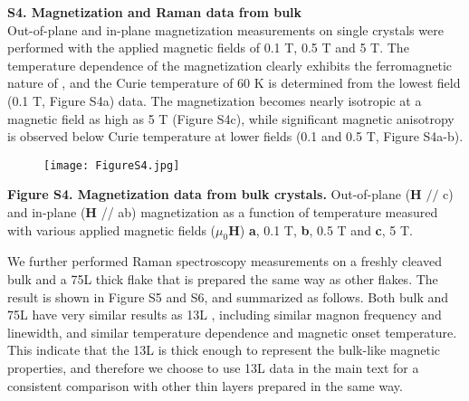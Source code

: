 \documentclass[prl, preprint, superscriptaddress]{revtex4-1}
\begin{document}

\noindent\textbf{S4. Magnetization and Raman data from bulk }\\

\noindent Out-of-plane and in-plane magnetization measurements on  single crystals were performed with the applied magnetic fields of 0.1 T, 0.5 T and 5 T. The temperature dependence of the magnetization clearly exhibits the ferromagnetic nature of , and the Curie temperature of 60 K is determined from the lowest field (0.1 T, Figure S4a) data. The magnetization becomes nearly isotropic at a magnetic field as high as 5 T (Figure S4c), while significant magnetic anisotropy is observed below Curie temperature at lower fields (0.1 and 0.5 T, Figure S4a-b).  

\begin{figure}[!h]
\texttt{[image: FigureS4.jpg]}
\end{figure}
\vspace{-5pt}
\begin{footnotesize}
\noindent\textbf{Figure S4. Magnetization data from bulk  crystals.} Out-of-plane (\textbf{H} $//$ c) and in-plane (\textbf{H} // ab) magnetization as a function of temperature measured with various applied magnetic fields ($\mu_0$\textbf{H}) \textbf{a}, 0.1 T, \textbf{b}, 0.5 T and \textbf{c}, 5 T. \\
\end{footnotesize}

\noindent We further performed Raman spectroscopy measurements on a freshly cleaved  bulk and a 75L thick  flake that is prepared the same way as other flakes. The result is shown in Figure S5 and S6, and summarized as follows. Both bulk and 75L  have very similar results as 13L , including similar magnon frequency and linewidth, and similar temperature dependence and magnetic onset temperature. This indicate that the 13L  is thick enough to represent the bulk-like magnetic properties, and therefore we choose to use 13L  data in the main text for a consistent comparison with other  thin layers prepared in the same way.

\newpage
\end{document}
